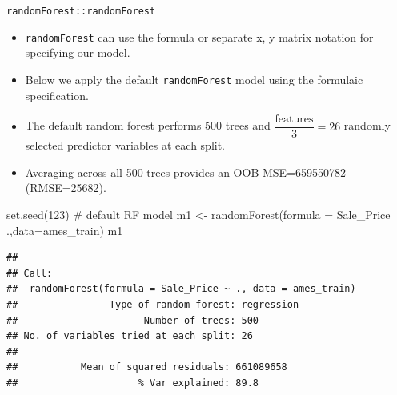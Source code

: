 \documentclass[10pt,ignorenonframetext,]{beamer}
\newenvironment{Shaded}{}{}
\newcommand{\KeywordTok}[1]{\textcolor[rgb]{0.00,0.00,1.00}{#1}}
\newcommand{\DataTypeTok}[1]{#1}
\newcommand{\DecValTok}[1]{#1}
\newcommand{\StringTok}[1]{\textcolor[rgb]{0.00,0.50,0.50}{#1}}
\newcommand{\CommentTok}[1]{\textcolor[rgb]{0.00,0.50,0.00}{#1}}
\newcommand{\OperatorTok}[1]{#1}
\newcommand{\NormalTok}[1]{#1}
\providecommand{\tightlist}{%
  \setlength{\itemsep}{0pt}\setlength{\parskip}{0pt}}
\begin{document}
\begin{frame}[fragile]{\texttt{randomForest::randomForest}}

\begin{itemize}
\tightlist
\item
  \texttt{randomForest} can use the formula or separate x, y matrix
  notation for specifying our model.
\item
  Below we apply the default \texttt{randomForest} model using the
  formulaic specification.
\item
  The default random forest performs 500 trees and
  \(\dfrac{\text{features}}{3}=26\) randomly selected predictor
  variables at each split.
\item
  Averaging across all 500 trees provides an OOB MSE=659550782
  (RMSE=25682).
\end{itemize}

\begin{Shaded}
\begin{Highlighting}[]
\KeywordTok{set.seed}\NormalTok{(}\DecValTok{123}\NormalTok{)}
\CommentTok{# default RF model}
\NormalTok{m1 <-}\StringTok{ }\KeywordTok{randomForest}\NormalTok{(}\DataTypeTok{formula =}\NormalTok{ Sale_Price }\OperatorTok{~}\StringTok{ }\NormalTok{.,}\DataTypeTok{data=}\NormalTok{ames_train)}
\NormalTok{m1}
\end{Highlighting}
\end{Shaded}

\begin{verbatim}
## 
## Call:
##  randomForest(formula = Sale_Price ~ ., data = ames_train) 
##                Type of random forest: regression
##                      Number of trees: 500
## No. of variables tried at each split: 26
## 
##           Mean of squared residuals: 661089658
##                     % Var explained: 89.8
\end{verbatim}

\end{frame}
\end{document}
